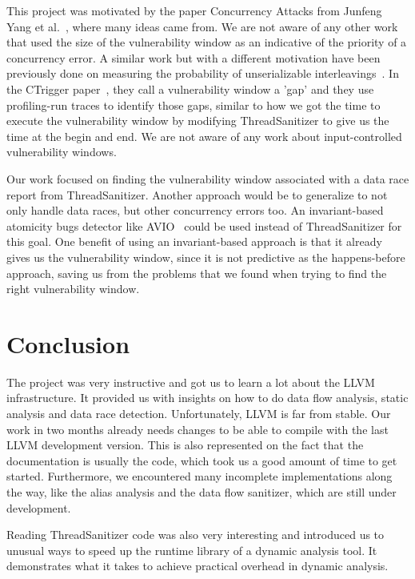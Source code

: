 \documentclass{acm_proc_article-sp}
\begin{document}
This project was motivated by the paper Concurrency Attacks from Junfeng Yang et al.~\cite{yang2012concurrency}, where many ideas came from. We are not aware of any other work that used the size of the vulnerability window as an indicative of the priority of a concurrency error. A similar work but with a different motivation have been previously done on measuring the probability of unserializable interleavings~\cite{park2009ctrigger}. In the CTrigger paper~\cite{park2009ctrigger}, they call a vulnerability window a 'gap' and they use profiling-run traces to identify those gaps, similar to how we got the time to execute the vulnerability window by modifying ThreadSanitizer to give us the time at the begin and end. We are not aware of any work about input-controlled vulnerability windows.

Our work focused on finding the vulnerability window associated with a data race report from ThreadSanitizer. Another approach would be to generalize to not only handle data races, but other concurrency errors too. An invariant-based atomicity bugs detector like AVIO~\cite{lu2006avio} could be used instead of ThreadSanitizer for this goal. One benefit of using an invariant-based approach is that it already gives us the vulnerability window, since it is not predictive as the happens-before approach, saving us from the problems that we found when trying to find the right vulnerability window. 

\section{Conclusion}

The project was very instructive and got us to learn a lot about the LLVM infrastructure. It provided us with insights on how to do data flow analysis, static analysis and data race detection.  Unfortunately, LLVM is far from stable. Our work in two months already needs changes to be able to compile with the last LLVM development version. This is also represented on the fact that the documentation is usually the code, which took us a good amount of time to get started. Furthermore, we encountered many incomplete implementations along the way, like the alias analysis and the data flow sanitizer, which are still under development.

Reading ThreadSanitizer code was also very interesting and introduced us to unusual ways to speed up the runtime library of a dynamic analysis tool. It demonstrates what it takes to achieve practical overhead in dynamic analysis.
\end{document}
